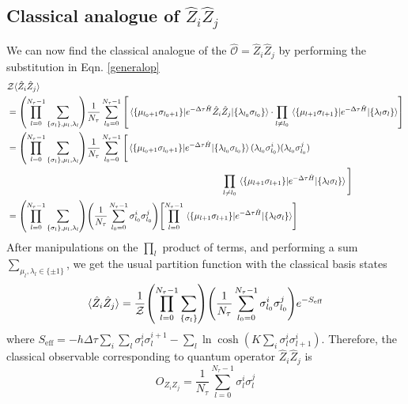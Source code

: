 \documentclass[../journal_main.tex]{subfiles}
\begin{document}
\subsection{Classical analogue of $\hat{Z}_i \hat{Z}_j$}
We can now find the classical analogue of the $ \hat{\mathcal{O}} =  \hat{Z}_i \hat{Z}_j$ by performing the substitution in Eqn. \eqref{generalop}
\begin{align*}
    & \mathcal{Z} \langle {\hat{Z}_i \hat{Z}_j} \rangle \\
    & = \qty(\prod_{l=0}^{N_\tau - 1} \sum_{\{\sigma_l \}, \mu_l, \lambda_l}) \frac{1}{N_\tau} \sum_{l_0 = 0}^{N_\tau - 1} \qty[\mel{\{\mu_{l_0+1} \sigma _{l_0+1}\}}{e^{-\Delta \tau \hat{H}} {\hat{Z}_i \hat{Z}_j}}{\{\lambda_{l_0} \sigma _{l_0}\}} \cdot \prod_{l \neq l_0} \mel{\{\mu_{l+1} \sigma _{l+1}\}}{e^{-\Delta \tau \hat{H}}}{\{\lambda_{l} \sigma _{l}\}} ] \\
    & =  \qty(\prod_{l=0}^{N_\tau - 1} \sum_{\{\sigma_l \}, \mu_l, \lambda_l}) \frac{1}{N_\tau} \sum_{l_0 = 0}^{N_\tau - 1} \Bigg[\mel{\{\mu_{l_0+1} \sigma _{l_0+1}\}}{e^{-\Delta \tau \hat{H}}}{\{\lambda_{l_0} \sigma _{l_0}\}} (\lambda_{l_0} \sigma^i_{l_0})(\lambda_{l_0} \sigma^j_{l_0}) \\ 
    & \qquad \qquad \qquad \qquad \qquad \qquad \qquad \qquad \qquad \qquad \qquad \qquad \prod_{l \neq l_0} \mel{\{\mu_{l+1} \sigma _{l+1}\}}{e^{-\Delta \tau \hat{H}}}{\{\lambda_{l} \sigma _{l}\}}\Bigg] \\
    & = \qty(\prod_{l=0}^{N_\tau - 1} \sum_{\{\sigma_l \}, \mu_l, \lambda_l}) \qty(\frac{1}{N_\tau} \sum_{l_0 = 0}^{N_\tau - 1} \sigma^i_{l_0} \sigma^j_{l_0}) \qty[\prod_{l = 0}^{N_\tau - 1} \mel{\{\mu_{l+1} \sigma _{l+1}\}}{e^{-\Delta \tau \hat{H}}}{\{\lambda_{l} \sigma _{l}\}} ]
\end{align*} 
After manipulations on the $\prod_l$ product of terms, and performing a sum $\sum_{\mu_l, \lambda_l \in \{\pm 1\}}$, we get the usual partition function with the classical basis states 
\[
    \langle {\hat{Z}_i \hat{Z}_j} \rangle = \frac{1}{\mathcal{Z}} \qty(\prod_{l=0}^{N_\tau - 1} \sum_{\{\sigma_l \}}) \qty(\frac{1}{N_\tau} \sum_{l_0 = 0}^{N_\tau - 1} \sigma^i_{l_0} \sigma^j_{l_0}) e^{-S_\text{eff}}
\]   
where $S_\text{eff} = -h \Delta \tau \sum_{i}\sum_{l} \sigma^i_l \sigma^{i+1}_l - \sum_l \ln\cosh(K \sum_i \sigma^i_l \sigma^i_{l+1})$. Therefore, the classical observable corresponding to quantum operator $\hat{Z}_i \hat{Z}_j$ is 
\begin{equation}
    \boxed{
        O_{Z_i Z_j} = \frac{1}{N_\tau} \sum_{l = 0}^{N_\tau - 1} \sigma^i_{l} \sigma^j_{l}
    }
    \label{classicalzizj}
\end{equation}  
\end{document}
